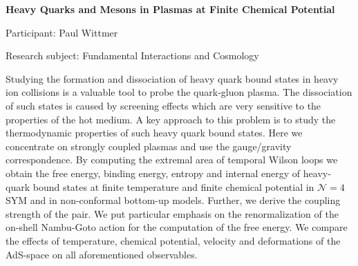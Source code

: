 \hfill 

\begin{minipage}[t]{1.0\textwidth}

\begin{center}

{{\large\bfseries Heavy Quarks and Mesons in Plasmas at Finite Chemical Potential}\par}

\end{center}

{\noindent Participant: Paul Wittmer\par} 

{\noindent Research subject: Fundamental Interactions and Cosmology\par}\medskip

\noindent Studying the formation and dissociation of heavy quark bound states in heavy ion collisions is a valuable tool to probe the quark-gluon plasma. The dissociation of such states is caused by screening effects which are very sensitive to the properties of the hot medium. A key approach to this problem is to study the thermodynamic properties of such heavy quark bound states. Here we concentrate on strongly coupled plasmas and use the gauge/gravity correspondence. By computing the extremal area of temporal Wilson loops we obtain the free energy, binding energy, entropy and internal energy of heavy-quark bound states at finite temperature and finite chemical potential in $\mathcal{N}=4$ SYM and in non-conformal bottom-up models. Further, we derive the coupling strength of the pair. We put particular emphasis on the renormalization of the on-shell Nambu-Goto action for the computation of the free energy. We compare the effects of temperature, chemical potential, velocity and deformations of the AdS-space on all aforementioned observables.\par\end{minipage}

\hfill 

